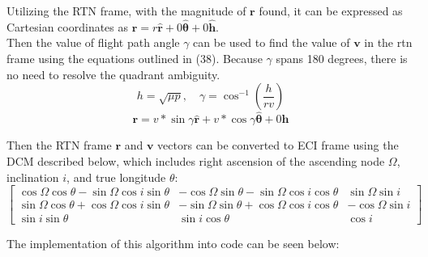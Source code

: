 \documentclass[titlepage]{article}
\begin{document}
Utilizing the RTN frame, with the magnitude of $\boldsymbol{r}$ found, it can be expressed as Cartesian coordinates as $\boldsymbol{r}=r\hat{\boldsymbol{r}}+0\hat{\boldsymbol{\theta}}+0\hat{\boldsymbol{h}}$.\\ 

Then the value of flight path angle $\gamma$ can be used to find the value of $\boldsymbol{v}$ in the rtn frame using the equations outlined in (38). Because $\gamma$ spans 180 degrees, there is no need to resolve the quadrant ambiguity.
\begin{equation}
	h = \sqrt{\mu p},\quad \gamma = \cos^{-1}\left({\frac{h}{rv}}\right)
\end{equation}
\begin{equation*}
	\boldsymbol{r}=v*\sin{\gamma}\hat{\boldsymbol{r}}+v*\cos{\gamma}\hat{\boldsymbol{\theta}}+0\hat{\boldsymbol{h}}
\end{equation*}

Then the RTN frame $\boldsymbol{r}$ and $\boldsymbol{v}$ vectors can be converted to ECI frame using the DCM described below, which includes right ascension of the ascending node $\Omega$, inclination $i$, and true longitude $\theta$:
\begin{equation}
	\left[
	\begin{matrix}
		\cos{\Omega}\cos{\theta}-\sin{\Omega}\cos{i}\sin{\theta} & -\cos{\Omega}\sin{\theta}-\sin{\Omega}\cos{i}\cos{\theta} & \sin{\Omega}\sin{i}\\
		\sin{\Omega}\cos{\theta}+\cos{\Omega}\cos{i}\sin{\theta} & -\sin{\Omega}\sin{\theta}+\cos{\Omega}\cos{i}\cos{\theta} & -\cos{\Omega}\sin{i}\\
		\sin{i}\sin{\theta} & \sin{i}\cos{\theta} & \cos{i}
	\end{matrix}
	\right]
\end{equation}

The implementation of this algorithm into code can be seen below:
\end{document}
